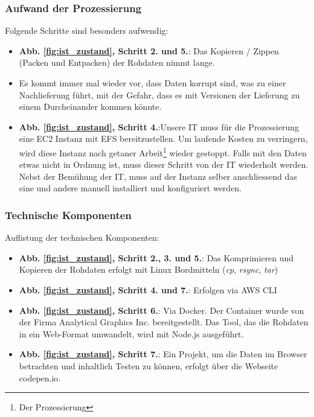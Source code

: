 \subsubsection{Aufwand der Prozessierung}
\label{aufwand_prozessierung}
Folgende Schritte sind besonders aufwendig:
\begin{itemize}
\item \textbf{Abb. \ref{fig:ist_zustand}, Schritt 2. und 5.}: Das Kopieren / Zippen (Packen und Entpacken) der Rohdaten nimmt lange.
\item Es kommt immer mal wieder vor, dass Daten korrupt sind, was zu einer Nachlieferung führt, mit der Gefahr, dass es mit Versionen der Lieferung zu einem Durcheinander kommen könnte.
\item \textbf{Abb. \ref{fig:ist_zustand}, Schritt 4.}:Unsere IT muss für die Prozessierung eine EC2 Instanz mit EFS bereitzustellen. Um laufende Kosten zu verringern, wird diese Instanz nach getaner Arbeit\footnote{Der Prozessierung} wieder gestoppt. Falls mit den Daten etwas nicht in Ordnung ist, muss dieser Schritt von der IT wiederholt werden. Nebst der Bemühung der IT, muss auf der Instanz selber anschliessend das eine und andere manuell installiert und konfiguriert werden.
\end{itemize}

\subsubsection{Technische Komponenten}
Auflistung der technischen Komponenten:
\begin{itemize}
\item \textbf{Abb. \ref{fig:ist_zustand}, Schritt 2., 3. und 5.}: Das Komprimieren und Kopieren der Rohdaten erfolgt mit Linux Bordmitteln (\emph{cp}, \emph{rsync}, \emph{tar})
\item \textbf{Abb. \ref{fig:ist_zustand}, Schritt 4. und 7.}: Erfolgen via AWS CLI
\item \textbf{Abb. \ref{fig:ist_zustand}, Schritt 6.}: Via Docker. Der Container wurde von der Firma Analytical Graphics Inc. \cite{AGI2010} bereitgestellt. Das Tool, das die Rohdaten in ein Web-Format umwandelt, wird mit Node.js ausgeführt.
\item \textbf{Abb. \ref{fig:ist_zustand}, Schritt 7.}: Ein Projekt, um die Daten im Browser betrachten und inhaltlich Testen zu können, erfolgt über die Webseite codepen.io.
\end{itemize}


